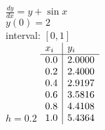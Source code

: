 {
$\displaystyle \frac{dy}{dx} = y + \sin x$\\
$y(0)=2$\\
interval: $[0,1]$\\
$h = 0.2$
}
{
	$\begin{array}[b]{l | l}
		x_i & y_i    \\ \hline
		0.0 & 2.0000 \\
		0.2 & 2.4000 \\
		0.4 & 2.9197 \\
		0.6 & 3.5816 \\
		0.8 & 4.4108 \\
		1.0 & 5.4364
	\end{array}$
}